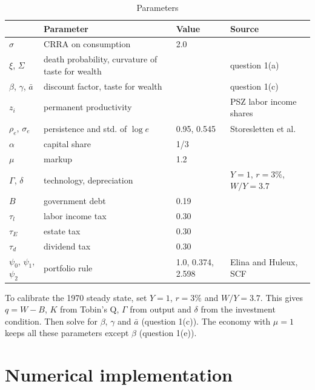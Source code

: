 \documentclass[12pt]{article}
\begin{document}
\begin{table}[h]
\centering
\caption{Parameters}
\small
\begin{tabularx}{\textwidth}{lXll}
\toprule
 & Parameter & Value & Source \\
\midrule
$\sigma$ & CRRA on consumption & 2.0 & \\
$\xi$, $\Sigma$ & death probability, curvature of taste for wealth & & question 1(a) \\
$\beta$, $\gamma$, $\bar a$ & discount factor, taste for wealth & & question 1(c) \\
$z_i$ & permanent productivity & & PSZ labor income shares \\
$\rho_e$, $\sigma_e$ & persistence and std. of $\log e$ & 0.95, 0.545 & Storesletten et al. \\
$\alpha$ & capital share & 1/3 & \\
$\mu$ & markup & 1.2 & \\
$\Gamma$, $\delta$ & technology, depreciation & & $Y=1$, $r=3\%$, $W/Y=3.7$ \\
$B$ & government debt & 0.19 & \\
$\tau_l$ & labor income tax & 0.30 & \\
$\tau_E$ & estate tax & 0.30 & \\
$\tau_d$ & dividend tax & 0.30 & \\
$\psi_0$, $\psi_1$, $\psi_2$ & portfolio rule & 1.0, 0.374, 2.598 & Elina and Huleux, SCF \\
\bottomrule
\end{tabularx}
\end{table}

To calibrate the 1970 steady state, set $Y=1$, $r=3\%$ and $W/Y=3.7$.
This gives $q=W-B$, $K$ from Tobin's Q, $\Gamma$ from output and $\delta$ from the investment condition.
Then solve for $\beta$, $\gamma$ and $\bar a$ (question 1(c)).
The economy with $\mu=1$ keeps all these parameters except $\beta$ (question 1(e)).

\section{Numerical implementation}
\end{document}
